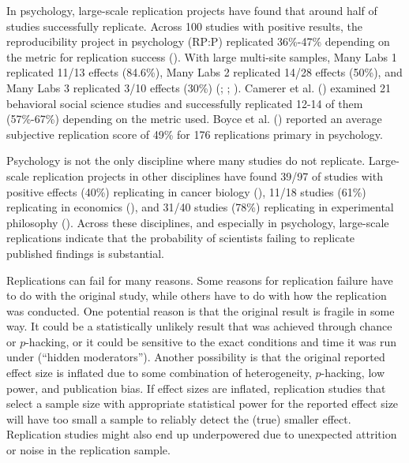 \documentclass[
  english,
  a4paper,
]{article}
\begin{document}
In psychology, large-scale replication projects have found that around half of studies successfully replicate.
Across 100 studies with positive results, the reproducibility project in psychology (RP:P) replicated 36\%-47\% depending on the metric for replication success ().
With large multi-site samples, Many Labs 1 replicated 11/13 effects (84.6\%), Many Labs 2 replicated 14/28 effects (50\%), and Many Labs 3 replicated 3/10 effects (30\%) (; ; ).
Camerer et al. () examined 21 behavioral social science studies and successfully replicated 12-14 of them (57\%-67\%) depending on the metric used.
Boyce et al. () reported an average subjective replication score of 49\% for 176 replications primary in psychology.

Psychology is not the only discipline where many studies do not replicate.
Large-scale replication projects in other disciplines have found 39/97 of studies with positive effects (40\%) replicating in cancer biology (), 11/18 studies (61\%) replicating in economics (), and 31/40 studies (78\%) replicating in experimental philosophy ().
Across these disciplines, and especially in psychology, large-scale replications indicate that the probability of scientists failing to replicate published findings is substantial.

Replications can fail for many reasons. Some reasons for replication failure have to do with the original study, while others have to do with how the replication was conducted.
One potential reason is that the original result is fragile in some way.
It could be a statistically unlikely result that was achieved through chance or \(p\)-hacking, or it could be sensitive to the exact conditions and time it was run under (``hidden moderators'').
Another possibility is that the original reported effect size is inflated due to some combination of heterogeneity, \(p\)-hacking, low power, and publication bias.
If effect sizes are inflated, replication studies that select a sample size with appropriate statistical power for the reported effect size will have too small a sample to reliably detect the (true) smaller effect.
Replication studies might also end up underpowered due to unexpected attrition or noise in the replication sample.
\end{document}
